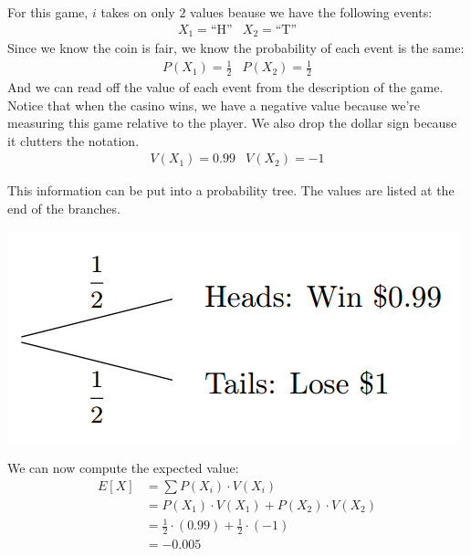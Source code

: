 \documentclass{ximera}
\begin{document}
For this game, $i$ takes on only $2$ values beause we have the following events:
\[ \begin{array}{cc}
      X_1 = \text{``H''} & X_2 = \text{``T''} 
\end{array} \]
Since we know the coin is fair, we know the probability of each event is the same:
\[ \begin{array}{cc}
      P(X_1) = \frac{1}{2} & P(X_2) = \frac{1}{2}
\end{array} \]
And we can read off the value of each event from the description of the game. Notice that when the casino wins, we have a negative value because we're measuring this game relative to the player. We also drop the dollar sign because it clutters the notation.
\[ \begin{array}{cc}
      V(X_1) = 0.99 & V(X_2) = -1
\end{array} \]

This information can be put into a probability tree. The values are listed at the end of the branches.

\begin{image}
\includegraphics{ExpectedValue1.png}
\end{image}

We can now compute the expected value:
\begin{align*}
  E[X] & = \sum P(X_i) \cdot V(X_i) \\
    & = P(X_1) \cdot V(X_1) + P(X_2) \cdot V(X_2) \\
    & = \frac{1}{2} \cdot (0.99) + \frac{1}{2} \cdot (-1) \\
    & = -0.005
\end{align*}
\end{document}
